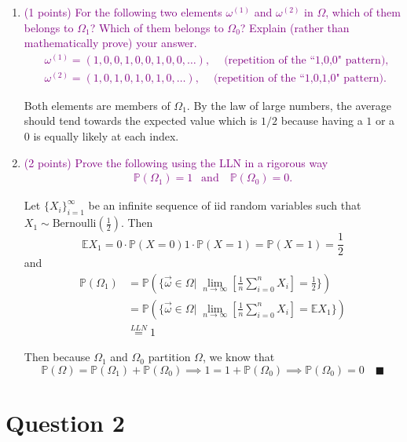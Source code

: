 \documentclass[11pt,letterpaper, leqno]{article}
\numberwithin{equation}{section}
\numberwithin{theorem}{section}
\numberwithin{lemma}{section}
\numberwithin{corollary}{section}
\numberwithin{definition}{section}
\numberwithin{proposition}{section}
\numberwithin{remark}{section}
\numberwithin{example}{section}
\renewcommand{\P}{\mathbb{P}}
\newcommand{\E}{\mathbb{E}}
\begin{document}
\begin{enumerate}[a]
    \item \textcolor{purple}{(1 points) For the following two elements $\omega^{(1)}$ and $\omega^{(2)}$ in $\Omega$, which of them belongs to $\Omega_1$? Which of them belongs to $\Omega_0$? Explain (rather than mathematically prove) your answer.
    \begin{align*}
        & \omega^{(1)}=(1,0,0,1,0,0,1,0,0, \ldots),\ \ \ \ \mbox{ (repetition of the ``1,0,0" pattern)},\\
        & \omega^{(2)}=(1,0,1,0,1,0,1,0,\ldots),\ \ \ \ \mbox{ (repetition of the ``1,0,1,0" pattern)}.
    \end{align*}}

    \color{blue}
        Both elements are members of $\Omega_1$. By the law of large numbers, the average should tend towards the expected value which is $1/2$ because having a $1$ or a $0$ is equally likely at each index.
    \color{black}

    \item \textcolor{purple}{(2 points) Prove the following using the LLN in a rigorous way
    \begin{align*}
        \mathbb{P}(\Omega_1)=1 \ \ \mbox{ and }\ \ \ \mathbb{P}(\Omega_0)=0.
    \end{align*}}

    \color{blue}
        Let $\{X_i\}_{i=1}^\infty$ be an infinite sequence of iid random variables such that $X_1 \sim \text{Bernoulli}(\frac{1}{2})$. Then 
        \[\E X_1 = 0\cdot \P(X = 0) 1\cdot \P(X = 1) = \P(X = 1) = \frac{1}{2}\]
        and
        \begin{align*}
            \P(\Omega_1) &= \P\left(\{\vec{\omega} \in \Omega \bigg\vert \;\lim_{n\to \infty} \left[\frac{1}{n}\sum_{i=0}^n X_i\right]  = \frac{1}{2}\}\right)\\
            &= \P\left(\{\vec{\omega} \in \Omega \bigg\vert \; \lim_{n\to \infty} \left[\frac{1}{n}\sum_{i=0}^n X_i\right] = \E X_1 \}\right)\\
            &\overset{LLN}{=} 1
        \end{align*}

        Then because $\Omega_1$ and $\Omega_0$ partition $\Omega$, we know that 
        \[\P(\Omega) = \P(\Omega_1) + \P(\Omega_0) \implies 1 = 1 + \P(\Omega_0) \implies \P(\Omega_0) = 0 \quad \blacksquare\]
    \color{black}
\end{enumerate}
\pagebreak

\section{Question 2}\label{Q2}
\end{document}
